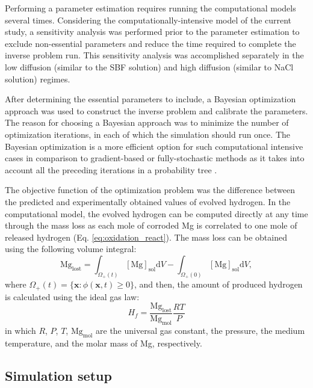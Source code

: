 Performing a parameter estimation requires running the computational models several times. Considering the computationally-intensive model of the current study, a sensitivity analysis was performed prior to the parameter estimation to exclude non-essential parameters and reduce the time required to complete the inverse problem run. This sensitivity analysis was accomplished separately in the low diffusion (similar to the SBF solution) and high diffusion (similar to NaCl solution) regimes.

After determining the essential parameters to include, a Bayesian optimization approach \cite{Mockus1989} was used to construct the inverse problem and calibrate the parameters. The reason for choosing a Bayesian approach was to minimize the number of optimization iterations, in each of which the simulation should run once. The Bayesian optimization is a more efficient option for such computational intensive cases in comparison to gradient-based or fully-stochastic methods as it takes into account all the preceding iterations in a probability tree \cite{Mehrian2017}.

The objective function of the optimization problem was the difference between the predicted and experimentally obtained values of evolved hydrogen. In the computational model, the evolved hydrogen can be computed directly at any time through the mass loss as each mole of corroded Mg is correlated to one mole of released hydrogen (Eq. \ref{eq:oxidation_react}). The mass loss can be obtained using the following volume integral:
\begin{equation} \label{eq:mass_loss}
\mathrm{Mg}_{\mathrm{lost}}=\int_{\Omega_{+}(t)} [\mathrm{Mg}]_{\mathrm{sol}} \mathrm{d} V-\int_{\Omega_{+}(0)} [\mathrm{Mg}]_{\mathrm{sol}} \mathrm{d} V,
\end{equation}
where $\Omega_{+}(t)=\{\mathbf{x}: \phi(\mathbf{x}, t) \geq 0\}$, and then, the amount of produced hydrogen is calculated using the ideal gas law:
\begin{equation} \label{eq:evolv_hydr}
H_{f}=\frac{\mathrm{Mg}_{\mathrm{lost}}}{\mathrm{Mg}_{\mathrm{mol}}} \frac{R T}{P}
\end{equation}
in which $R$, $P$, $T$, $\mathrm{Mg}_{\mathrm{mol}}$ are the universal gas constant, the pressure, the medium temperature, and  the molar mass of Mg, respectively.

\subsection{Simulation setup}

